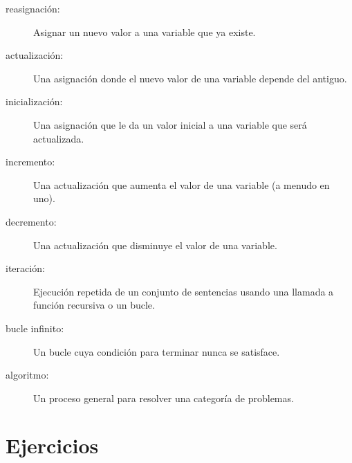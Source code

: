 \documentclass[10pt]{book}
\begin{document}
\begin{description}

\item[reasignación:] Asignar un nuevo valor a una variable que
ya existe.

\item[actualización:] Una asignación donde el nuevo valor de una variable
depende del antiguo.

\item[inicialización:] Una asignación que le da un valor inicial a
una variable que será actualizada.

\item[incremento:] Una actualización que aumenta el valor de una variable
(a menudo en uno).

\item[decremento:] Una actualización que disminuye el valor de una variable.

\item[iteración:] Ejecución repetida de un conjunto de sentencias usando
una llamada a función recursiva o un bucle.

\item[bucle infinito:] Un bucle cuya condición para terminar nunca
se satisface.

\item[algoritmo:]  Un proceso general para resolver una categoría de
problemas.

\end{description}


\section{Ejercicios}
\end{document}
